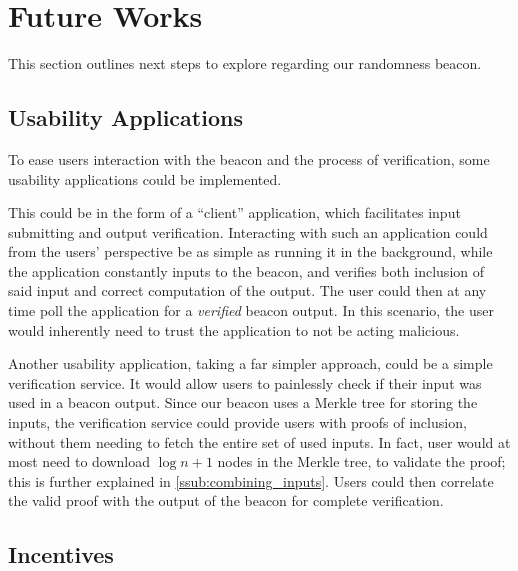 \section{Future Works}%
\label{sec:future_works}
This section outlines next steps to explore regarding our randomness beacon.


\subsection{Usability Applications}%
\label{sub:usability_applications}
To ease users interaction with the beacon and the process of verification, some usability applications could be implemented.

This could be in the form of a \enquote{client} application, which facilitates input submitting and output verification.
Interacting with such an application could from the users' perspective be as simple as running it in the background, while the application constantly inputs to the beacon, and verifies both inclusion of said input and correct computation of the output.
The user could then at any time poll the application for a \emph{verified} beacon output.
In this scenario, the user would inherently need to trust the application to not be acting malicious.

Another usability application, taking a far simpler approach, could be a simple verification service.
It would allow users to painlessly check if their input was used in a beacon output.
Since our beacon uses a Merkle tree for storing the inputs, the verification service could provide users with proofs of inclusion, without them needing to fetch the entire set of used inputs.
In fact, user would at most need to download $\log{n} + 1$ nodes in the Merkle tree, to validate the proof; this is further explained in \vref{ssub:combining_inputs}.
Users could then correlate the valid proof with the output of the beacon for complete verification.

\subsection{Incentives}


